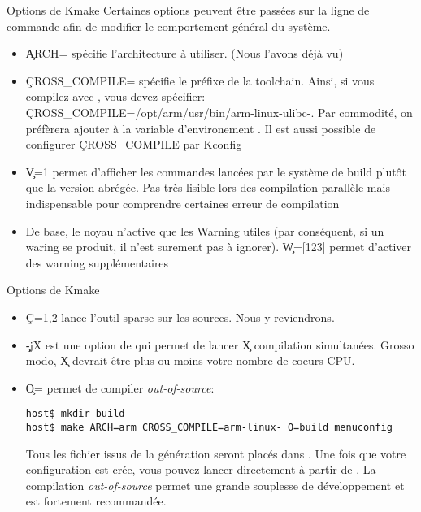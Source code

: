 \begin{frame}[fragile=singleslide]{Options de Kmake}
  Certaines options peuvent être passées sur la ligne de commande afin
  de modifier le comportement général du système.
  \begin{itemize}
  \item  \c{ARCH=} spécifie l'architecture  à utiliser.  (Nous l'avons
    déjà vu)
  \item \c{CROSS_COMPILE=} spécifie le préfixe de la toolchain. Ainsi,
    si vous  compilez avec ,
    vous                        devez                       spécifier:
    \c{CROSS_COMPILE=/opt/arm/usr/bin/arm-linux-ulibc-}.            Par
    commodité,  on  préfèrera   ajouter    à  la
    variable  d'environement  .  Il  est aussi  possible  de
    configurer \c{CROSS_COMPILE} par Kconfig
  \item \c{V=1} permet d'afficher les commandes lancées par le système
    de build plutôt que la  version abrégée. Pas très lisible lors des
    compilation parallèle mais indispensable pour comprendre certaines
    erreur de compilation
  \item  De  base, le  noyau  n'active  que  les Warning  utiles  (par
    conséquent,  si un  waring se  produit,  il n'est  surement pas  à
    ignorer).     \c{W=[123]}    permet    d'activer    des    warning
    supplémentaires
\end{itemize} 
\end{frame} 

\begin{frame}[fragile=singleslide]{Options de Kmake}
\begin{itemize} 
  \item  \c{C={1,2}} lance  l'outil  sparse sur  les  sources. Nous  y
    reviendrons.
  \item  \c{-jX} est  une option  de   qui permet  de lancer
    \c{X}  compilation simultanées.  Grosso modo,  \c{X}  devrait être
    plus ou moins votre nombre de coeurs CPU.
  \item \c{O=} permet de compiler \emph{out-of-source}:
    \begin{lstlisting}
host$ mkdir build
host$ make ARCH=arm CROSS_COMPILE=arm-linux- O=build menuconfig
    \end{lstlisting} %
    Tous  les  fichier  issus  de  la génération  seront  placés  dans
    .  Une fois  que  votre configuration  est crée,  vous
    pouvez lancer  directement  à partir de . La
    compilation  \emph{out-of-source} permet  une grande  souplesse de
    développement et est fortement recommandée.
  \end{itemize} 
\end{frame}

